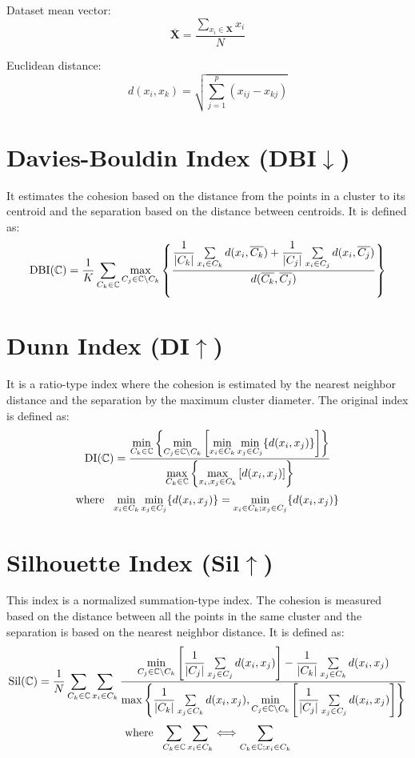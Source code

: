 \documentclass{article}
\begin{document}
Dataset mean vector:
\[ \overline{\bm X}=\dfrac{\sum\limits_{x_i\in \bm X}x_i}{N} \]

Euclidean distance:
\[ d(x_i,x_k)=\sqrt{\sum\limits_{j=1}^p(x_{ij}-x_{kj})} \]


\section{Davies-Bouldin Index (DBI$\downarrow$) \cite{ref2}}
It estimates the cohesion based on the distance from the points in a cluster to its centroid and the separation based on the distance between centroids. It is defined as:
\[ {\rm DBI}(\mathbb{C})=\dfrac{1}{K}\sum\limits_{C_k\in\mathbb{C}}\max\limits_{C_j\in\mathbb{C}\backslash C_k}\left\{ \dfrac{\dfrac{1}{|C_k|}\sum\limits_{x_i\in C_k}d(x_i,\overline{C_k})+\dfrac{1}{|C_j|}\sum\limits_{x_i\in C_j}d(x_i,\overline{C_j})}{d(\overline{C_k},\overline{C_j})} \right\} \]


\section{Dunn Index (DI$\uparrow$) \cite{ref3}}
It is a ratio-type index where the cohesion is estimated by the nearest neighbor distance and the separation by the maximum cluster diameter. The original index is defined as:
\[ {\rm DI}(\mathbb{C})=\dfrac{\min\limits_{C_k\in\mathbb{C}}\left\{ \min\limits_{C_j\in\mathbb{C}\backslash C_k}\left[ \min\limits_{x_i\in C_k}\min\limits_{x_j\in C_j}\{ d(x_i,x_j) \} \right] \right\}}{\max\limits_{C_k\in\mathbb{C}}\left\{ \max\limits_{x_i,x_j\in C_k}\left[d(x_i,x_j)\right] \right\} } \]
\[ {\rm where}\ \ \min\limits_{x_i\in C_k}\min\limits_{x_j\in C_j}\{ d(x_i,x_j)\}=\min\limits_{x_i\in C_k;x_j\in C_j}\{ d(x_i,x_j)\} \]


\section{Silhouette Index (Sil$\uparrow$) \cite{ref4}}
This index is a normalized summation-type index. The cohesion is measured based on the distance between all the points in the same cluster and the separation is based on the nearest neighbor distance. It is defined as:
\[ {\rm Sil}(\mathbb{C})=\dfrac{1}{N}\sum\limits_{C_k\in\mathbb{C}}\sum\limits_{x_i\in C_k}\dfrac{\min\limits_{C_j\in\mathbb{C}\backslash C_k}\left[ \dfrac{1}{|C_j|}\sum\limits_{x_j\in C_j}d(x_i,x_j) \right]-\dfrac{1}{|C_k|}\sum\limits_{x_j\in C_k}d(x_i,x_j)}{\max\left\{ \dfrac{1}{|C_k|}\sum\limits_{x_j\in C_k}d(x_i,x_j),\min\limits_{C_j\in\mathbb{C}\backslash C_k}\left[ \dfrac{1}{|C_j|}\sum\limits_{x_j\in C_j}d(x_i,x_j) \right] \right\}} \]
\[ {\rm where}\ \ \sum\limits_{C_k\in\mathbb{C}}\sum\limits_{x_i\in C_k}\Longleftrightarrow \sum\limits_{C_k\in\mathbb{C};x_i\in C_k} \]
\end{document}
